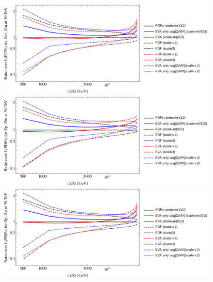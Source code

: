 \documentclass[a4paper,11pt]{article}
\begin{document}
\begin{figure}[ht]
\includegraphics[width=0.46\linewidth]{Notebooks/PlotLumi/30TeV/ratios/Zm-Zm.pdf}
\includegraphics[width=0.46\linewidth]{Notebooks/PlotLumi/30TeV/ratios/Zp-Zm.pdf}
\includegraphics[width=0.46\linewidth]{Notebooks/PlotLumi/30TeV/ratios/Zp-Zp.pdf}
\end{figure}

%
%
\end{document}
